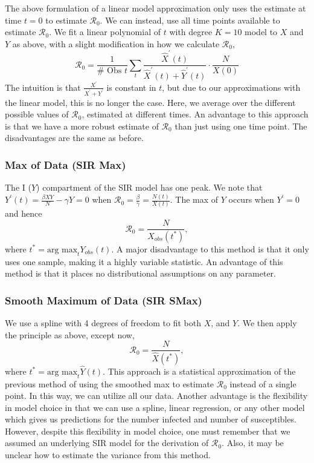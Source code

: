 \documentclass[12pt]{article}
\newcommand{\rr}{\ensuremath{\mathcal{R}_0}}
\begin{document}
The above formulation of a linear model approximation only uses the estimate at time $t=0$ to estimate $\rr$.  We can instead, use all time points available to estimate $\rr$.  We fit a linear polynomial of \(t\) with degree \(K= 10\) model to \(X\)
and \(Y\) as above, with a slight modification in how we calculate
\(\rr\),
\[\rr = \frac{1}{\# \text{ Obs }t}\sum_t \frac{\hat{X}^\prime(t)}{ \hat{X}^\prime(t) + \hat{Y}^\prime(t)} \cdot \frac{N}{X(0)} \]
The intuition is that $\frac{X^\prime}{X^\prime + Y^\prime}$ is constant in $t$, but due to our approximations with the linear model, this is no longer the case.  Here, we average over the different possible values of $\rr$, estimated at different times.  An advantage to this approach is that we have a more robust estimate of $\rr$ than just using one time point.  The disadvantages are the same as before.

\subsubsection{Max of Data (SIR Max)}\label{max-of-data}
The I ($Y$) compartment of the SIR model has one peak.    We note that \(Y^\prime(t) = \frac{\beta XY}{N} - \gamma Y = 0\) when \(\rr = \frac{\beta}{\gamma} = \frac{N(t)}{X(t)}\). The max
of \(Y\) occurs when \(Y^\prime = 0\) and hence
\[\rr = \frac{N}{X_{obs}(t^*)},\] where
\(t^* = \text{arg max}_{t} Y_{obs}(t)\).   A major disadvantage to this method is that it only uses one sample, making it a highly variable statistic.  An advantage of this method is that it places no distributional assumptions on any parameter.

\subsubsection{Smooth Maximum of Data (SIR SMax)}\label{smooth-maximum-of-data}

We use a spline with 4 degrees of freedom to fit both \(X\), and \(Y\).
We then apply the principle as above, except now,
\[\rr = \frac{N}{\hat{X}(t^*)},\] where
\(t^* = \text{arg max}_{t} \hat{Y}(t)\).   This approach is a statistical approximation of the previous method of using the smoothed max to estimate $\rr$ instead of a single point.  In this way, we can utilize all our data.  Another advantage is the flexibility in model choice in that we can use a spline, linear regression, or any other model which gives us predictions for the number infected and number of susceptibles.  However, despite this flexibility in model choice, one must remember that we assumed an underlying SIR model for the derivation of $\rr$.  Also, it may be unclear how to estimate the variance from this method.
\end{document}
